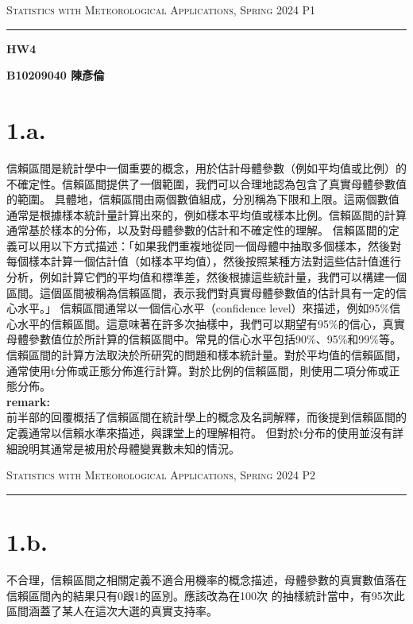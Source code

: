\documentclass{article}
\author{B10209040 陳彥倫}
\begin{document}
\thispagestyle{empty}
\hfill {\scshape \large Statistics with Meteorological Applications, Spring 2024} \hfill {\scshape P1}
\smallskip
\hrule
\begin{CJK*}{UTF8}{bsmi}
\bigskip
\bigskip
\bigskip

\centerline{\huge \textbf {HW4}}
\bigskip
\centerline{\textbf {B10209040 陳彥倫}}

\section*{1.a.}
    \begin{spacing}{2}
        \begin{large}
            信賴區間是統計學中一個重要的概念，用於估計母體參數（例如平均值或比例）的不確定性。信賴區間提供了一個範圍，我們可以合理地認為包含了真實母體參數值的範圍。
            具體地，信賴區間由兩個數值組成，分別稱為下限和上限。這兩個數值通常是根據樣本統計量計算出來的，例如樣本平均值或樣本比例。信賴區間的計算通常基於樣本的分佈，以及對母體參數的估計和不確定性的理解。
            信賴區間的定義可以用以下方式描述：「如果我們重複地從同一個母體中抽取多個樣本，然後對每個樣本計算一個估計值（如樣本平均值），然後按照某種方法對這些估計值進行分析，例如計算它們的平均值和標準差，然後根據這些統計量，我們可以構建一個區間。這個區間被稱為信賴區間，表示我們對真實母體參數值的估計具有一定的信心水平。」
            信賴區間通常以一個信心水平（confidence level）來描述，例如95\%信心水平的信賴區間。這意味著在許多次抽樣中，我們可以期望有95\%的信心，真實母體參數值位於所計算的信賴區間中。常見的信心水平包括90\%、95\%和99\%等。
            信賴區間的計算方法取決於所研究的問題和樣本統計量。對於平均值的信賴區間，通常使用t分佈或正態分佈進行計算。對於比例的信賴區間，則使用二項分佈或正態分佈。\\
            \textbf{remark:}\\
            前半部的回覆概括了信賴區間在統計學上的概念及名詞解釋，而後提到信賴區間的定義通常以信賴水準來描述，與課堂上的理解相符。
            但對於t分布的使用並沒有詳細說明其通常是被用於母體變異數未知的情況。
        \end{large}
    \end{spacing}

\newpage

\thispagestyle{empty}
\hfill {\scshape \large Statistics with Meteorological Applications, Spring 2024} \hfill {\scshape P2}
\smallskip
\hrule
\bigskip
\bigskip
\bigskip

\section*{1.b.}
\begin{spacing}{2}
    \begin{large}
        不合理，信賴區間之相關定義不適合用機率的概念描述，母體參數的真實數值落在信賴區間內的結果只有0跟1的區別。應該改為在100次
        的抽樣統計當中，有95次此區間涵蓋了某人在這次大選的真實支持率。
    \end{large}
\end{spacing}


\end{CJK*}
\end{document}

